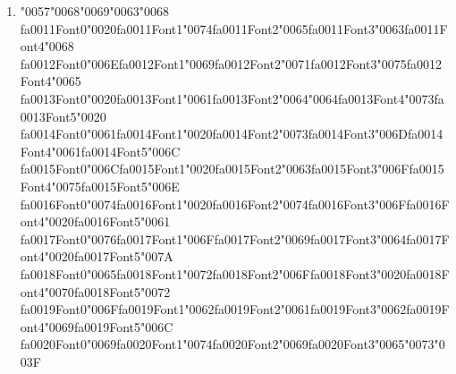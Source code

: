 \documentclass[12pt]{article}
\begin{document}
\begin{enumerate}[label=Q\arabic*.]
\begin{enumerate}[label=(\Alph*)]
    \item Generative models model $P(x,y)$, while discriminative models model $P(y \mid x)$
    \item Discriminative models learn the data distribution and use that knowledge for classification
    \item Discriminative models require no training data
    \item Generative models are less explainable
\end{enumerate}
\item {\char"0057}{\char"0068}{\char"0069}{\char"0063}{\char"0068} {\csname fa0011Font0\endcsname\char"0020}{\csname fa0011Font1\endcsname\char"0074}{\csname fa0011Font2\endcsname\char"0065}{\csname fa0011Font3\endcsname\char"0063}{\csname fa0011Font4\endcsname\char"0068} {\csname fa0012Font0\endcsname\char"006E}{\csname fa0012Font1\endcsname\char"0069}{\csname fa0012Font2\endcsname\char"0071}{\csname fa0012Font3\endcsname\char"0075}{\csname fa0012Font4\endcsname\char"0065} {\csname fa0013Font0\endcsname\char"0020}{\csname fa0013Font1\endcsname\char"0061}{\csname fa0013Font2\endcsname\char"0064}{\char"0064}{\csname fa0013Font4\endcsname\char"0073}{\csname fa0013Font5\endcsname\char"0020} {\csname fa0014Font0\endcsname\char"0061}{\csname fa0014Font1\endcsname\char"0020}{\csname fa0014Font2\endcsname\char"0073}{\csname fa0014Font3\endcsname\char"006D}{\csname fa0014Font4\endcsname\char"0061}{\csname fa0014Font5\endcsname\char"006C} {\csname fa0015Font0\endcsname\char"006C}{\csname fa0015Font1\endcsname\char"0020}{\csname fa0015Font2\endcsname\char"0063}{\csname fa0015Font3\endcsname\char"006F}{\csname fa0015Font4\endcsname\char"0075}{\csname fa0015Font5\endcsname\char"006E} {\csname fa0016Font0\endcsname\char"0074}{\csname fa0016Font1\endcsname\char"0020}{\csname fa0016Font2\endcsname\char"0074}{\csname fa0016Font3\endcsname\char"006F}{\csname fa0016Font4\endcsname\char"0020}{\csname fa0016Font5\endcsname\char"0061} {\csname fa0017Font0\endcsname\char"0076}{\csname fa0017Font1\endcsname\char"006F}{\csname fa0017Font2\endcsname\char"0069}{\csname fa0017Font3\endcsname\char"0064}{\csname fa0017Font4\endcsname\char"0020}{\csname fa0017Font5\endcsname\char"007A} {\csname fa0018Font0\endcsname\char"0065}{\csname fa0018Font1\endcsname\char"0072}{\csname fa0018Font2\endcsname\char"006F}{\csname fa0018Font3\endcsname\char"0020}{\csname fa0018Font4\endcsname\char"0070}{\csname fa0018Font5\endcsname\char"0072} {\csname fa0019Font0\endcsname\char"006F}{\csname fa0019Font1\endcsname\char"0062}{\csname fa0019Font2\endcsname\char"0061}{\csname fa0019Font3\endcsname\char"0062}{\csname fa0019Font4\endcsname\char"0069}{\csname fa0019Font5\endcsname\char"006C} {\csname fa0020Font0\endcsname\char"0069}{\csname fa0020Font1\endcsname\char"0074}{\csname fa0020Font2\endcsname\char"0069}{\csname fa0020Font3\endcsname\char"0065}{\char"0073}{\char"003F}

\end{enumerate}
\end{document}
